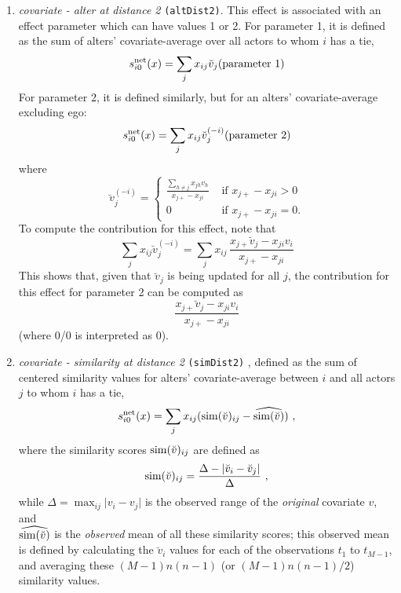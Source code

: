 \documentclass[a4paper,fleqn,11pt]{article}
\newcommand{\+}{\, + \,}
\newcommand{\vit}{\theenumi}
\newcounter{savenumi}
\begin{document}
\begin{enumerate}
\setcounter{enumi}{\value{savenumi}}

\item \emph{covariate - alter at distance 2} \texttt{(altDist2)}.
      This effect is associated with an effect parameter
      which can have values 1 or 2.
      For parameter 1, it is
      defined as the sum of alters' covariate-average over all actors
      to whom $i$ has a tie,
\[
 s^{\rm net}_{i\vit}(x) = \sum_j x_{ij} \breve v_j \hfill
            (\text{parameter 1}) \hfill
\]
      For parameter 2, it is defined similarly,
      but for an alters' covariate-average excluding
      ego:
\[
 s^{\rm net}_{i\vit}(x) = \sum_j x_{ij} \breve v_j^{(-i)} \hfill
                          (\text{parameter 2}) \hfill
\]
      where
\begin{equation}
  \breve v_j^{(-i)} = \left\{\begin{array}{ll} \displaystyle
         \frac{\sum_{h \neq j} x_{jh}v_h}{x_{j+} - x_{ji}}  &
                                       \text{ if } x_{j+} - x_{ji} > 0     \\
         0                                &  \text{ if } x_{j+}- x_{ji} = 0  .
  \end{array}   \right.            \label{alt_av2}
\end{equation}
      To compute the contribution for this effect, note that
\[
 \sum_j x_{ij} \breve v_j^{(-i)} = \sum_j x_{ij} \,
                      \frac{x_{j+} \breve v_j - x_{ji}v_i}{x_{j+}-x_{ji}}
\]
      This shows that, given that $\breve v_j$ is being updated for all $j$,
      the contribution for this effect for parameter 2 can be computed as
      \[
       \frac{x_{j+} \breve v_j - x_{ji}v_i}{x_{j+}-x_{ji}}
      \]
      (where 0/0 is interpreted as 0).
\item \emph{covariate - similarity at distance 2} \texttt{(simDist2)} ,
      defined as the sum of centered similarity
      values for alters' covariate-average between $i$ and all actors
      $j$ to whom $i$ has a tie,
\[
 s^{\rm net}_{i\vit}(x) = \sum_j x_{ij} ({\rm sim}(\breve v)_{ij}
  - \widehat{{\rm sim}(\breve v)}) \ ,
\]
 where the similarity scores ${\rm sim}(\breve v)_{ij}$ are defined as
\[
{\rm sim}(\breve v)_{ij}=
 \frac{\Delta-\vert \breve v_i - \breve v_j \vert}{\Delta} \ ,
\]
 while
 $\Delta=\max_{ij}\vert v_i - v_j \vert$ is the observed range of the
 \emph{original} covariate $v$, and\\
 $\widehat{{\rm sim}(\breve v)}$ is the
 \emph{observed} mean of all these similarity scores;
 this observed mean is defined by calculating the $\breve v_i$ values
 for each of the observations $t_1$ to $t_{M-1}$, and averaging
 these
 $(M-1)n(n-1)$ (or $(M-1)n(n-1)/2$) similarity values.
\end{enumerate}
\end{document}
